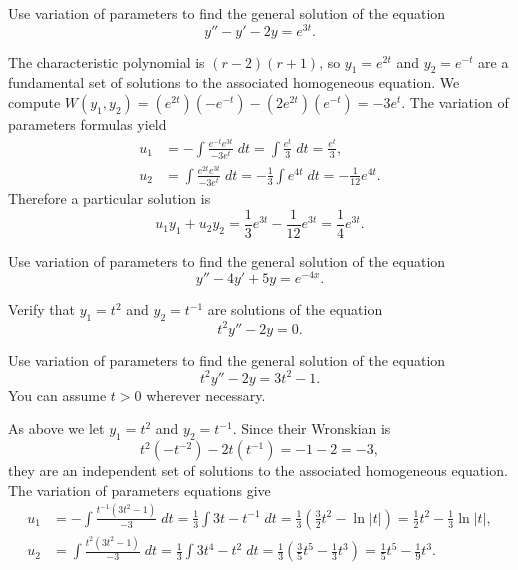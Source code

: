 \documentclass[answers,11pt]{exam}
\begin{document}
\begin{questions}

\question Use variation of parameters to find the general solution of the equation
\[
    y'' - y' - 2y = e^{3t}.
\]

\begin{solution}
    The characteristic polynomial is $(r - 2)(r + 1)$, so $y_1 = e^{2t}$ and $y_2 = e^{-t}$ are a fundamental set of solutions to the associated homogeneous equation. We compute $W(y_1, y_2) = (e^{2t})(-e^{-t}) - (2e^{2t})(e^{-t}) = -3e^{t}$. The variation of parameters formulas yield
    \begin{align*}
        u_1 &= -\int \frac{e^{-t} e^{3t}}{-3e^t} \; dt = \int \frac{e^t}{3} \; dt = \frac{e^t}{3}, \\
        u_2 &= \int \frac{e^{2t} e^{3t}}{-3e^t} \; dt = -\frac{1}{3} \int e^{4t} \; dt = -\frac{1}{12} e^{4t}.
    \end{align*}
    Therefore a particular solution is
    \[
        u_1 y_1 + u_2 y_2 = \frac{1}{3} e^{3t} - \frac{1}{12} e^{3t} = \frac{1}{4} e^{3t}.
    \]
\end{solution}

\question Use variation of parameters to find the general solution of the equation
\[
    y'' - 4y' + 5y = e^{-4x}.
\]

\question Verify that $y_1 = t^2$ and $y_2 = t^{-1}$ are solutions of the equation
\[
    t^2 y'' - 2y = 0.
\]

\question Use variation of parameters to find the general solution of the equation
\[
    t^2 y'' - 2y = 3t^2 - 1.
\]
You can assume $t > 0$ wherever necessary.

\begin{solution}
    As above we let $y_1 = t^2$ and $y_2 = t^{-1}$. Since their Wronskian is 
    \[
        t^2 (-t^{-2}) - 2t(t^{-1}) = -1 -2 = -3,
    \]
    they are an independent set of solutions to the associated homogeneous equation. The variation of parameters equations give
    \begin{align*}
        u_1 &= -\int \frac{t^{-1} (3t^2 - 1)}{-3} \; dt = \frac{1}{3} \int 3t - t^{-1} \; dt = \frac{1}{3} \left(\frac{3}{2} t^2 - \ln |t|\right) = \frac{1}{2} t^2 - \frac{1}{3} \ln |t|, \\
        u_2 &= \int \frac{t^2(3t^2-1)}{-3} \; dt = \frac{1}{3} \int 3t^4 - t^2 \; dt = \frac{1}{3} \left( \frac{3}{5}t^5 - \frac{1}{3}t^3 \right) = \frac{1}{5} t^5 - \frac{1}{9} t^3.
    \end{align*}
\end{solution}

\end{questions}
\end{document}
